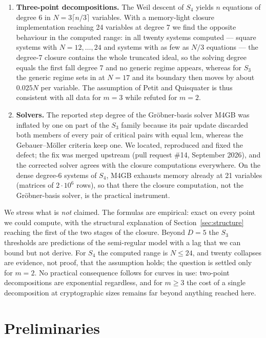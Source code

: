 \documentclass[11pt,a4paper]{article}
\theoremstyle{remark}\newtheorem{remark}{Remark}
\begin{document}
\begin{enumerate}
\item \textbf{Three-point decompositions.} The Weil descent of $S_4$ yields $n$ equations of degree 6 in $N=3\lceil n/3\rceil$ variables. With a memory-light closure implementation reaching 24 variables at degree 7 we find the opposite behaviour in the computed range: in all twenty systems computed --- square systems with $N=12,\dots,24$ and systems with as few as $N/3$ equations --- the degree-7 closure contains the whole truncated ideal, so the solving degree equals the first fall degree 7 and no generic regime appears, whereas for $S_3$ the generic regime sets in at $N=17$ and its boundary then moves by about $0.025N$ per variable. The assumption of Petit and Quisquater is thus consistent with all data for $m=3$ while refuted for $m=2$.

\item \textbf{Solvers.} The reported step degree of the Gröbner-basis solver M4GB \cite{MS17} was inflated by one on part of the $S_3$ family because its pair update discarded both members of every pair of critical pairs with equal lcm, whereas the Gebauer--Möller criteria keep one. We located, reproduced and fixed the defect; the fix was merged upstream (pull request \#14, September 2026), and the corrected solver agrees with the closure computations everywhere. On the dense degree-6 systems of $S_4$, M4GB exhausts memory already at 21 variables (matrices of $2\cdot10^6$ rows), so that there the closure computation, not the Gröbner-basis solver, is the practical instrument.
\end{enumerate}

We stress what is \emph{not} claimed. The formulas are empirical: exact on every point we could compute, with the structural explanation of Section~\ref{sec:structure} reaching the first of the two stages of the closure. Beyond $D=5$ the $S_3$ thresholds are predictions of the semi-regular model with a lag that we can bound but not derive. For $S_4$ the computed range is $N\le24$, and twenty collapses are evidence, not proof, that the assumption holds; the question is settled only for $m=2$. No practical consequence follows for curves in use: two-point decompositions are exponential regardless, and for $m\ge3$ the cost of a single decomposition at cryptographic sizes remains far beyond anything reached here.

\section{Preliminaries}
\end{document}

